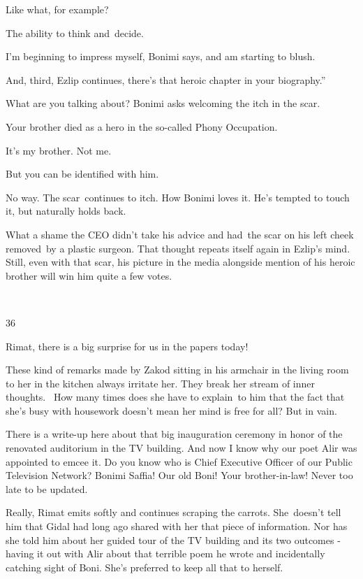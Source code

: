 \documentclass[twoside,11pt]{book}
\begin{document}
{\textquotedbl}Like what, for example?{\textquotedbl} 

{\textquotedbl}The ability to think and~decide.{\textquotedbl} 

{\textquotedbl}I'm beginning to impress myself,{\textquotedbl} Bonimi says, {\textquotedbl}and am starting to
blush.{\textquotedbl} 

{\textquotedbl}And, third,{\textquotedbl} Ezlip continues, {\textquotedbl}there's that heroic chapter in your
biography.''

{\textquotedbl}What are you talking about?{\textquotedbl} Bonimi asks welcoming the itch in the scar.~

{\textquotedbl}Your brother died as a hero in the so-called Phony Occupation.{\textquotedbl} 

{\textquotedbl}It's my brother. Not me.{\textquotedbl} 

{\textquotedbl}But you can be identified with him.{\textquotedbl} 

{\textquotedbl}No way.{\textquotedbl} The scar\ continues to itch. How Bonimi loves it. He's tempted to touch it, but
naturally holds back.\ \ 

What a shame the CEO didn't take his advice and had\ the scar on his left cheek removed~by a plastic surgeon. That
thought repeats itself again in Ezlip's mind. Still, even with that scar, his picture in the media alongside mention of
his heroic brother will win him quite a few votes.

~

36 

{\textquotedbl}Rimat, there is a big surprise for us in the papers today!{\textquotedbl}

These kind of remarks made by Zakod sitting in his armchair in the living room to her in the kitchen always irritate
her. They break her stream of inner thoughts. {\ }How many times does
she have to explain{\ }to him that the fact that she's busy with housework
doesn't mean her mind is free for all? But in vain. 

{\textquotedbl}There is a write-up here about that big inauguration ceremony in honor of the renovated auditorium in the
TV building. And now I know why our poet Alir was appointed to emcee it. Do you know who is Chief Executive Officer of
our Public Television Network? Bonimi Saffia! Our old Boni! Your brother-in-law! Never too late to be
updated.{\textquotedbl} 

{\textquotedbl}Really,{\textquotedbl} Rimat emits softly and continues scraping the carrots. She~doesn't tell him that
Gidal had long ago shared with her that piece of information. Nor has she told him about her guided tour of the TV
building and its two outcomes - having it out with Alir about that terrible poem he wrote and incidentally catching
sight of Boni. She{}'s preferred to keep all that to herself. ~
\end{document}
